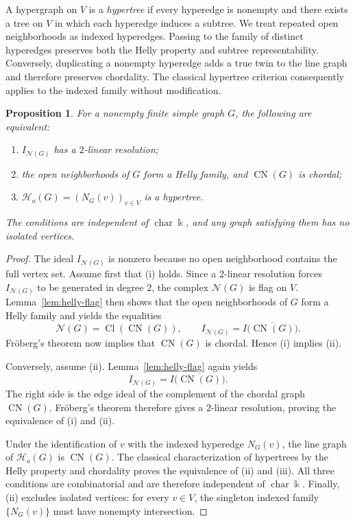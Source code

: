 \documentclass[11pt]{amsart}
\newtheorem{proposition}[theorem]{Proposition}
\theoremstyle{definition}
\theoremstyle{remark}
\numberwithin{equation}{section}
\newcommand{\NN}{\mathcal N}
\newcommand{\Ho}{\mathcal H_{\!o}}
\newcommand{\Cl}{\operatorname{Cl}}
\newcommand{\CN}{\operatorname{CN}}
\begin{document}
	A hypergraph on \(V\) is a \emph{hypertree} if every hyperedge is nonempty and
	there exists a tree on \(V\) in which each hyperedge induces a subtree. We
	treat repeated open neighborhoods as indexed hyperedges. Passing to the family
	of distinct hyperedges preserves both the Helly property and subtree
	representability. Conversely, duplicating a nonempty hyperedge adds a true twin
	to the line graph and therefore preserves chordality. The classical hypertree
	criterion consequently applies to the indexed family without modification.
	
	\begin{proposition}\label{prop:background}
		For a nonempty finite simple graph \(G\), the following are equivalent:
		\begin{enumerate}[label=\textup{(\roman*)}]
			\item \(I_{\NN(G)}\) has a \(2\)-linear resolution;
			\item the open neighborhoods of \(G\) form a Helly family, and \(\CN(G)\) is chordal;
			\item \(\Ho(G)=(N_G(v))_{v\in V}\) is a hypertree.
		\end{enumerate}
		The conditions are independent of \(\operatorname{char}\Bbbk\), and any
		graph satisfying them has no isolated vertices.
	\end{proposition}
	
	\begin{proof}
		The ideal \(I_{\NN(G)}\) is nonzero because no open neighborhood contains the
		full vertex set. Assume first that \textup{(i)} holds. Since a \(2\)-linear
		resolution forces \(I_{\NN(G)}\) to be generated in degree \(2\), the complex
		\(\NN(G)\) is flag on \(V\). Lemma~\ref{lem:helly-flag} then shows that the open neighborhoods of \(G\)
		form a Helly family and yields the equalities
		\[
		\NN(G)=\Cl(\CN(G)),
		\qquad
		I_{\NN(G)}=I\bigl(\overline{\CN(G)}\bigr).
		\]
		Fr\"oberg's theorem \cite[Theorem~1]{Froberg1990} now implies that
		\(\CN(G)\) is chordal. Hence \textup{(i)} implies \textup{(ii)}.
		
		Conversely, assume \textup{(ii)}. Lemma~\ref{lem:helly-flag} again yields
		\[
		I_{\NN(G)}=I\bigl(\overline{\CN(G)}\bigr).
		\]
		The right side is the edge ideal of the complement of the chordal graph
		\(\CN(G)\). Fr\"oberg's theorem therefore gives a \(2\)-linear resolution,
		proving the equivalence of \textup{(i)} and \textup{(ii)}.
		
		Under the identification of \(v\) with the indexed hyperedge \(N_G(v)\), the
		line graph of \(\Ho(G)\) is \(\CN(G)\). The classical characterization of hypertrees by the Helly property
		and chordality \cite{BrandstadtDraganChepoiVoloshin1998} proves the
		equivalence of \textup{(ii)} and \textup{(iii)}. All three conditions are
		combinatorial and are therefore independent of \(\operatorname{char}\Bbbk\).
		Finally, \textup{(ii)} excludes isolated vertices: for every \(v\in V\), the
		singleton indexed family \(\{N_G(v)\}\) must have nonempty intersection.
	\end{proof}
\end{document}
